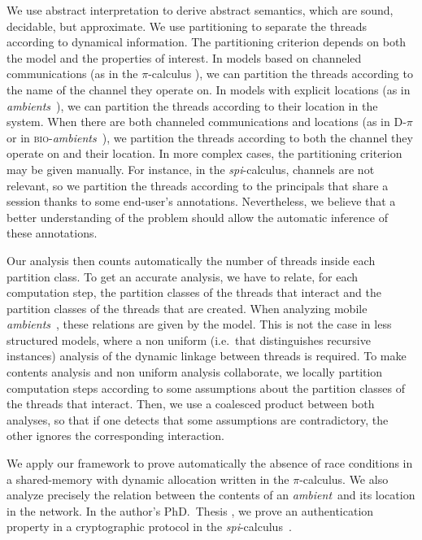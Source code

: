 \documentclass{article}
\newcommand{\picalcul}{$\pi$-calculus}
\newcommand{\ambient}{\emph{ambient}}
\newcommand{\ambients}{\emph{ambients}}
\newcommand{\spicalcul}{{\emph{spi}-calculus}}
\newcommand{\bioambients}{{\textsc{bio}-\emph{ambients}}}
\begin{document}
We use abstract interpretation \cite{c:thesis,cc:popl77} to derive abstract semantics, which are sound, decidable, but approximate. We use partitioning \cite{cc:popl79,bourdoncle} to separate the  threads according to dynamical information.  The partitioning criterion depends on both the model and the properties of interest. In models based on channeled communications (as in the $\pi$-calculus \cite{milner:polyadic}), we can partition the threads according to the name of the channel they operate on. In models with explicit locations (as in \ambients\ \cite{ambients}), we can partition the threads according to their location in the system. When there are both channeled communications and locations (as in D-$\pi$ \cite{Dpi} or in \bioambients\ \cite{bio}), we partition the threads according to both the channel they operate on and their location.
In more complex cases, the partitioning criterion may be given manually.
For instance, in the \spicalcul, channels are not relevant, so we partition the threads according to the principals that share a session \cite[p:269]{feret:thesis} thanks to some end-user's annotations. Nevertheless, we believe that a better understanding of the problem 
should allow the automatic inference of these annotations.

Our analysis then counts automatically the number of threads inside  each partition class. To get an accurate analysis, we have to relate, for each computation step,  the partition classes of  the threads that interact and  the partition classes of the threads that are created. When analyzing mobile \ambients\ \cite{NiNi00popl}, these relations are given by the model.
This is not the case in less structured models, where a non uniform (i.e.~that distinguishes recursive instances) analysis \cite{feret:sas2000,feret:esop2002,feret:jlap,feret:thesis} of the dynamic linkage between threads is required. To make contents analysis and non uniform analysis collaborate, we locally partition computation steps \cite{mauborgne:rival05} 
according to some assumptions about the partition classes of the threads that interact. Then, we use a coalesced product between both analyses, so that if 
one detects that some assumptions are contradictory, the other ignores the corresponding interaction. 


We apply our framework to prove  automatically the absence of race conditions in a shared-memory with dynamic allocation written in the \picalcul. We also analyze precisely the relation between the contents of an \ambient\ and its location in the network. In the author's PhD.~Thesis \cite{feret:thesis}, we prove an authentication property \cite{BlanchetSAS02} in a cryptographic protocol \cite{Woo}   in the \spicalcul\ \cite{spi}.
\end{document}
